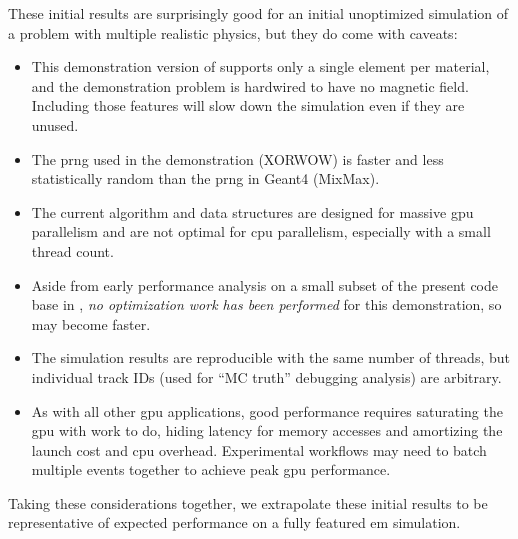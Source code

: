 These initial results are surprisingly good for an initial
unoptimized simulation of a problem with multiple realistic physics,
but they do come with caveats:
\begin{itemize}[itemsep=0pt]
  \item This demonstration version of \celeritas supports only a single element
    per material, and the demonstration problem is hardwired to have no magnetic
    field. Including those features will slow down the simulation even if they
    are unused.
  \item The \ac{prng} used in the \celeritas demonstration ({XORWOW}) is faster
    and less statistically random than the \ac{prng} in Geant4 ({MixMax}).
  \item The current \celeritas algorithm and data structures are designed for
    massive \ac{gpu} parallelism and are not optimal for \ac{cpu} parallelism,
    especially with a small thread count.
  \item Aside from early performance analysis on a small subset of the present
    code base in \cite{johnson_2021}, \emph{no optimization work has been
    performed} for this demonstration, so \celeritas may become faster.
  \item The simulation results are reproducible with the same number of threads,
    but individual track IDs (used for ``MC truth'' debugging analysis) are
    arbitrary.
  \item As with all other \ac{gpu} applications, good performance requires
    saturating the \ac{gpu} with work to do, hiding latency for memory accesses
    and amortizing the launch cost and \ac{cpu} overhead. Experimental workflows
    may need to batch multiple events together to achieve peak \ac{gpu}
    performance.
\end{itemize}
Taking these considerations together, we extrapolate these initial results to be
representative of expected performance on a fully featured \celeritas \ac{em}
simulation.

